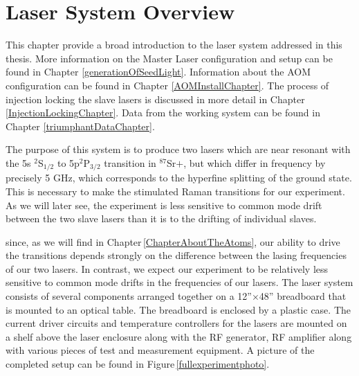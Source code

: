 \chapter{Laser System Overview}

This chapter provide a broad introduction to the laser system addressed in this thesis. More information on the Master Laser configuration and setup can be found in Chapter \ref{generationOfSeedLight}. Information about the AOM configuration can be found in Chapter \ref{AOMInstallChapter}. The process of injection locking the slave lasers is discussed in more detail in Chapter \ref{InjectionLockingChapter}. Data from the working system can be found in Chapter \ref{triumphantDataChapter}.

The purpose of this system is to produce two lasers which are near resonant with the 5s $^2$S$_{1/2}$ to 5p$^2$P$_{3/2}$ transition in $^{87}$Sr$+$, but which differ in frequency by precisely 5 GHz, which corresponds to the hyperfine splitting of the ground state. This is necessary to make the stimulated Raman transitions for our experiment. As we will later see, the experiment is less sensitive to common mode drift between the two slave lasers than it is to the drifting of individual slaves.

since, as we will find in Chapter\,\ref{ChapterAboutTheAtoms}, our ability to drive the transitions depends strongly on the difference between the lasing frequencies of our two lasers. In contrast, we expect our experiment to be relatively less sensitive to common mode drifts in the frequencies of our lasers.
The laser system consists of several components arranged together on a 12''$\times$48'' breadboard that is mounted to an optical table. The breadboard is enclosed by a plastic case. The current driver circuits and temperature controllers for the lasers are mounted on a shelf above the laser enclosure along with the RF generator, RF amplifier along with various pieces of test and measurement equipment.  A picture of the completed setup can be found in Figure\,\ref{fullexperimentphoto}. 

